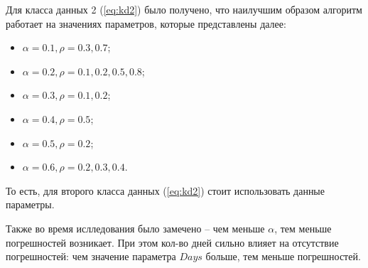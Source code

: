Для класса данных 2 (\ref{eq:kd2}) было получено, что наилучшим образом алгоритм работает на значениях параметров, которые представлены далее:
\begin{itemize}
    \item $\alpha = 0.1, \rho = 0.3, 0.7$;
    \item $\alpha = 0.2, \rho = 0.1, 0.2, 0.5, 0.8$;
    \item $\alpha = 0.3, \rho = 0.1, 0.2$;
    \item $\alpha = 0.4, \rho = 0.5$;
    \item $\alpha = 0.5, \rho = 0.2$;
    \item $\alpha = 0.6, \rho = 0.2, 0.3, 0.4$.
\end{itemize} 
То есть, для второго класса данных (\ref{eq:kd2}) стоит использовать данные параметры.

Также во время ислледования было замечено -- чем меньше $\alpha$, тем меньше погрешностей возникает. При этом кол-во дней сильно влияет на отсутствие погрешностей: чем значение параметра $Days$ больше, тем меньше погрешностей.
